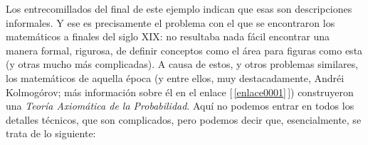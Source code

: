 Los entrecomillados del final de este ejemplo indican que esas son descripciones informales. Y ese es precisamente el problema con el que se encontraron los matemáticos a finales del siglo XIX: no resultaba nada fácil encontrar una manera formal, rigurosa, de definir conceptos como el área para figuras como esta (y otras mucho más complicadas). A causa de estos, y otros problemas similares, los matemáticos de aquella época (y entre ellos, muy destacadamente, Andréi Kolmogórov; más información sobre él en el enlace [\,\ref{enlace0001}\label{enlace0001a}\,])\label{enlace0001a}
construyeron una {\em Teoría Axiomática de la Probabilidad}. Aquí no podemos entrar en todos los
detalles técnicos, que son complicados, pero podemos decir que, esencialmente, se trata de lo siguiente:
